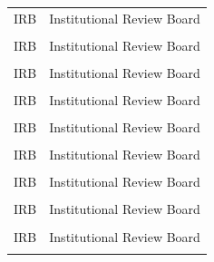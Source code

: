 {\begin{table}[H]
\begin{tabular}{ m{2.2cm}  m{12cm} }
IRB & Institutional Review Board \\ \\
IRB & Institutional Review Board \\ \\
IRB & Institutional Review Board \\ \\
IRB & Institutional Review Board \\ \\
IRB & Institutional Review Board \\ \\
IRB & Institutional Review Board \\ \\
IRB & Institutional Review Board \\ \\
IRB & Institutional Review Board \\ \\
IRB & Institutional Review Board \\ \\
\end{tabular} 
\end{table}
}